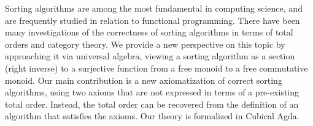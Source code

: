 Sorting algorithms are among the most fundamental in computing science, and are frequently studied in relation to functional programming. There have been many investigations of the correctness of sorting algorithms in terms of total orders and category theory. We provide a new perspective on this topic by approaching it via universal algebra, viewing a sorting algorithm as a section (right inverse) to a surjective function from a free monoid to a free commutative monoid. Our main contribution is a new axiomatization of correct sorting algorithms, using two axioms that are not expressed in terms of a pre-existing total order. Instead, the total order can be recovered from the definition of an algorithm that satisfies the axioms. Our theory is formalized in Cubical Agda.  





%
